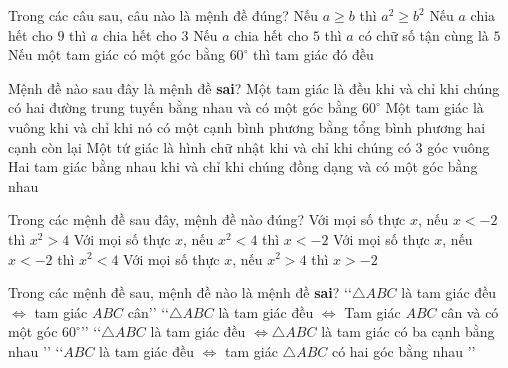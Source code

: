 \begin{ex}%
	Trong các câu  sau, câu nào là mệnh đề đúng?
	 \choice
		{Nếu $a\ge b$ thì $a^2\geq b^2$} 
		{\True Nếu $a$ chia hết cho  $9$ thì $a$ chia hết cho $3$}
		{Nếu $a$ chia hết cho $5$ thì  $a$ có chữ số tận cùng là $5$}
		 {Nếu một tam giác có một góc bằng $60^\circ $ thì tam giác đó đều}
\end{ex}

\begin{ex}%
	Mệnh đề nào sau đây là mệnh đề \textbf{sai}? 
	 \choice
		{Một tam giác là đều khi và chỉ khi chúng có hai đường trung tuyến bằng nhau và  có một góc bằng $60^\circ$}
		{Một tam giác là vuông khi và  chỉ khi nó có một cạnh bình phương bằng tổng bình phương hai cạnh còn lại}
		{Một tứ giác là hình  chữ nhật khi và chỉ khi chúng có $3$ góc vuông}
		{\True Hai tam giác bằng nhau khi và chỉ khi  chúng đồng dạng và có một góc bằng nhau}
\end{ex}

\begin{ex}%
	Trong các mệnh đề  sau đây, mệnh đề nào đúng?
	\choice 
		{\True Với mọi số thực $x$, nếu  $x<-2$ thì $x^2>4$}
		{Với  mọi số thực $x$, nếu $x^2<4$ thì $x<-2$}
		{Với mọi số thực  $x$, nếu $x<-2$ thì $x^2<4$}
		{Với mọi số thực $x$, nếu $x^2>4$  thì $x>-2$}
\end{ex}

\begin{ex}%
	Trong các mệnh đề sau, mệnh đề nào  là mệnh đề \textbf{sai}?
	 \choice
		{\True \lq\lq $\triangle ABC$ là tam giác đều $\Leftrightarrow  $ tam giác $ABC$ cân\rq\rq}
		{\lq\lq $\triangle ABC$ là tam giác đều $\Leftrightarrow $ Tam giác $ABC$ cân  và có một góc $60^\circ$\rq\rq}
		{\lq\lq $\triangle ABC$ là tam giác đều $\Leftrightarrow \triangle ABC$ là tam giác có ba cạnh bằng nhau \rq\rq} 
		{\lq\lq $ABC$ là tam giác đều $\Leftrightarrow$  tam giác $\triangle ABC$ có hai góc bằng nhau \rq\rq}
\end{ex}

